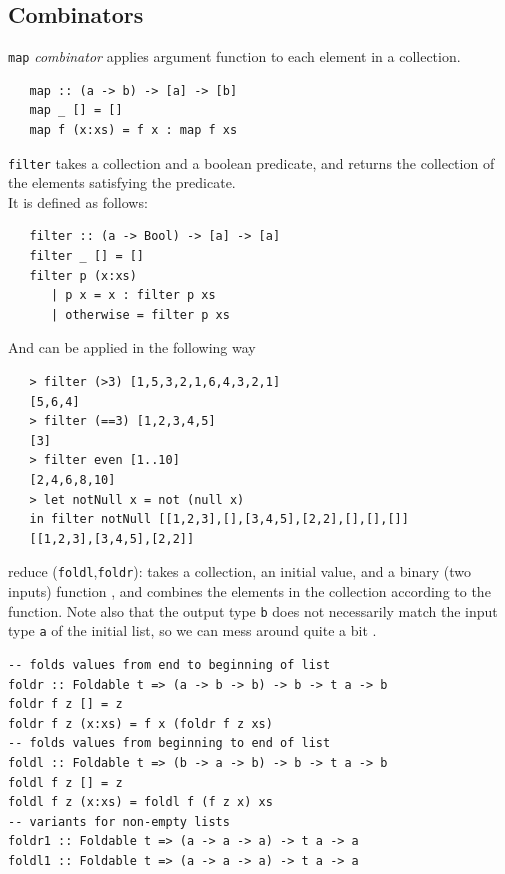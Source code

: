 \subsection{Combinators}
\lstinline|map| \textit{combinator} applies argument function to each element in
a collection.
\begin{lstlisting}
   map :: (a -> b) -> [a] -> [b]
   map _ [] = []
   map f (x:xs) = f x : map f xs
\end{lstlisting}

\lstinline|filter| takes a collection and a boolean predicate, and
returns the collection of the elements satisfying the
predicate.\\
It is defined as follows:
\begin{lstlisting}
   filter :: (a -> Bool) -> [a] -> [a]
   filter _ [] = []
   filter p (x:xs)
      | p x = x : filter p xs
      | otherwise = filter p xs
\end{lstlisting}
And can be applied in the following way
\begin{lstlisting}
   > filter (>3) [1,5,3,2,1,6,4,3,2,1]
   [5,6,4]
   > filter (==3) [1,2,3,4,5]
   [3]
   > filter even [1..10]
   [2,4,6,8,10]
   > let notNull x = not (null x)
   in filter notNull [[1,2,3],[],[3,4,5],[2,2],[],[],[]]
   [[1,2,3],[3,4,5],[2,2]]
\end{lstlisting}

reduce (\lstinline|foldl|,\lstinline|foldr|): takes a collection, an initial value,
and a binary (two inputs) function , and combines the elements in the
collection according to the function.
Note also that the output  type \lstinline|b| does not necessarily match the input type \lstinline|a| of the initial list, so we can mess around quite a bit \smiley.

\begin{lstlisting}
-- folds values from end to beginning of list
foldr :: Foldable t => (a -> b -> b) -> b -> t a -> b
foldr f z [] = z
foldr f z (x:xs) = f x (foldr f z xs)
-- folds values from beginning to end of list
foldl :: Foldable t => (b -> a -> b) -> b -> t a -> b
foldl f z [] = z
foldl f z (x:xs) = foldl f (f z x) xs
-- variants for non-empty lists
foldr1 :: Foldable t => (a -> a -> a) -> t a -> a
foldl1 :: Foldable t => (a -> a -> a) -> t a -> a
\end{lstlisting}

